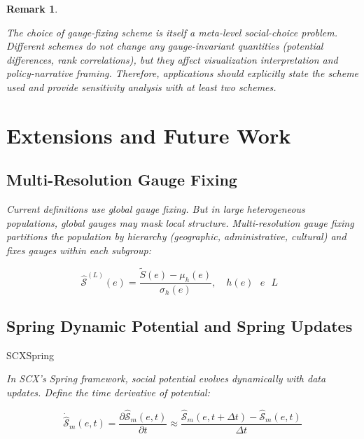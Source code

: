 \documentclass[11pt,a4paper]{article}
\theoremstyle{definition}
\newtheorem{remark}{ Remark}[section]
\newcommand{\Sop}{\hat{\mathcal{S}}}
\begin{document}
\begin{remark}
\textit{}


\textit{The choice of gauge-fixing scheme is itself a \textit{meta-level social-choice problem}. Different schemes do not change any gauge-invariant quantities (potential differences, rank correlations), but they affect visualization interpretation and policy-narrative framing. Therefore, applications should explicitly state the scheme used and provide sensitivity analysis with at least two schemes.}
\end{remark}

\section{ Extensions and Future Work}

\subsection{ Multi-Resolution Gauge Fixing}




\medskip
\noindent\textit{Current definitions use global gauge fixing. But in large heterogeneous populations, global gauges may mask local structure. Multi-resolution gauge fixing partitions the population by hierarchy (geographic, administrative, cultural) and fixes gauges within each subgroup:}

\begin{equation}
    \Sop^{(L)}(e) = \frac{\tilde{S}(e) - \mu_h(e)}{\sigma_h(e)}, \quad h(e) \text{  } e \text{  } L \text{ }
\end{equation}

\noindent \textit{}\textit{}

\subsection{Spring Dynamic Potential and Spring Updates}

SCXSpring

\medskip
\noindent\textit{In SCX's Spring framework, social potential evolves dynamically with data updates. Define the time derivative of potential:}

\begin{equation}
    \dot{\Sop}_m(e, t) = \frac{\partial \Sop_m(e, t)}{\partial t} \approx \frac{\Sop_m(e, t+\Delta t) - \Sop_m(e, t)}{\Delta t}
\end{equation}
\end{document}
